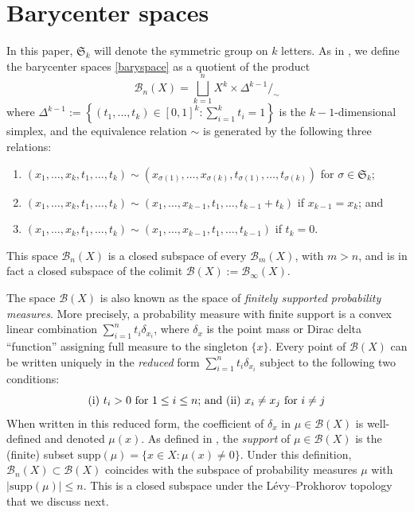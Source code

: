 \documentclass[11pt,a4paper]{article}
\numberwithin{equation}{section}
\theoremstyle{definition}
\theoremstyle{remark}
\newcommand{\BB}{\mathcal B}
\begin{document}
\section{Barycenter spaces}\label{prelim}

In this paper, $\mathfrak S_k$ will denote the symmetric group on $k$ letters. As in \cite{KallelKaroui2011, KW}, we define the barycenter spaces \eqref{baryspace} as a quotient of the product
\[
\BB_n(X)=\bigsqcup_{k=1}^n X^k\times \Delta^{k-1}\slash_{\sim}
\] where 
$\displaystyle\Delta^{k-1}:=\left\{(t_1,\ldots, t_k)\in[0,1]^k:\sum_{i=1}^kt_i=1\right\}$
is the $k-1$-dimensional simplex, and
the equivalence relation $\sim$ is generated by the following three relations:
\begin{enumerate}\setlength{\itemsep}{0pt}
\item $(x_1,\ldots, x_k,t_1,\ldots, t_k)\sim(x_{\sigma(1)},\ldots, x_{\sigma(k)}, t_{\sigma(1)},\ldots, t_{\sigma(k)})$ for $\sigma\in \mathfrak S_k$;
\item $(x_1,\ldots, x_k,t_1,\ldots, t_k)\sim (x_1,\ldots, x_{k-1}, t_1,\ldots, t_{k-1}+t_k)$ if $x_{k-1}=x_k$; and
\item $(x_1,\ldots, x_k,t_1,\ldots, t_k)\sim (x_1,\ldots, x_{k-1}, t_1,\ldots, t_{k-1})$ if $t_k=0$.
\end{enumerate}
This space $\BB_n(X)$ is a closed subspace of every $\BB_m(X)$, with $m>n$, and is in fact a closed subspace of the colimit $\BB(X):= \BB_\infty(X)$. 

The space $\BB(X)$ is also known as the space of \textit{finitely supported probability measures}.
More precisely,  a probability measure with finite support is a convex linear combination $\sum_{i=1}^nt_i\delta_{x_i}$, where $\delta_x$ is the point mass or Dirac delta ``function'' assigning full measure to the singleton $\{x\}$. 
Every point of $\BB(X)$ can be written uniquely in the \textit{reduced} form $\sum_{i=1}^nt_i\delta_{x_i}$ subject to the following two conditions: 
$$\hbox{(i) $t_i>0$ for $1\leq i\leq n$; and (ii) $x_i\neq x_j$ for $i\neq j$}$$
When written in this reduced form, the coefficient of $\delta_x$ in $\mu\in \BB(X)$ is well-defined and denoted $\mu(x)$. As defined in \cite{DJ, KW}, the \emph{support} of $\mu\in\BB(X)$ is the (finite) subset $\mathrm{supp}(\mu)=\{x\in X: \mu(x)\neq0\}$. Under this definition, $\BB_n(X)\subset \BB(X)$ coincides with the subspace of probability measures $\mu$ with $|\mathrm{supp}(\mu)|\leq n$.  This is a closed subspace under the L\'{e}vy--Prokhorov
topology that we discuss next.
\end{document}
